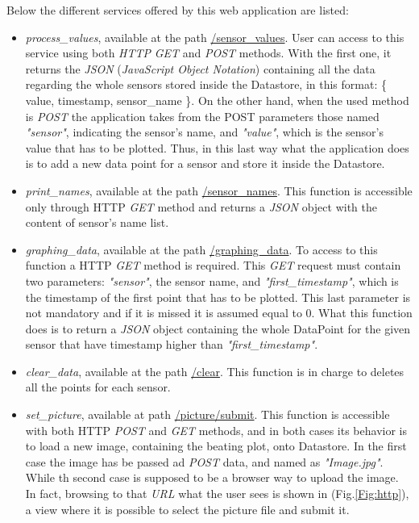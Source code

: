  Below the different services offered by this web application are listed:
 \begin{itemize}
 	\item \textit{process\_values}, available at the path \url{/sensor_values}. User can access to this service using both \textit{HTTP} \textit{GET} and \textit{POST} methods. With the first one, it  returns the \textit{JSON} (\textit{JavaScript Object Notation}) containing all the data regarding the whole sensors stored inside the Datastore, in this format: \{ value, timestamp, sensor\_name \}. On the other hand, when the used method is \textit{POST} the application takes from the POST parameters those named \textit{"sensor"}, indicating the sensor's name, and \textit{"value"}, which is the sensor's value that has to be plotted. Thus, in this last way what the application does is to add a new data point for a sensor and store it inside the Datastore.
 	\item \textit{print\_names}, available at the path \url{/sensor_names}. This function is accessible only through HTTP \textit{GET} method and returns a \textit{JSON} object with the content of sensor's name list.
 	\item \textit{graphing\_data}, available at the path \url{/graphing_data}. To access to  this function a HTTP \textit{GET} method is required. This \textit{GET} request must contain two parameters: \textit{"sensor"}, the sensor name, and \textit{"first\_timestamp"}, which is the timestamp of the first point that has to be plotted. This last parameter is not mandatory and if it is missed it is assumed equal to $0$. What this function does is to return a \textit{JSON} object containing the whole DataPoint for the given sensor that have timestamp higher than \textit{"first\_timestamp"}.
 	\item \textit{clear\_data}, available at the path \url{/clear}. This function is in charge to deletes all the points for each sensor.
 	\item \textit{set\_picture}, available at path \url{/picture/submit}. This function is accessible with both HTTP \textit{POST} and \textit{GET} methods, and in both cases its behavior is to load a new image, containing the beating plot, onto Datastore. In the first case the image has be passed ad \textit{POST} data, and named as \textit{"Image.jpg"}. While th second case is supposed to be a browser way to upload the image. In fact, browsing to that \textit{URL} what the user sees is shown in (Fig.\ref{Fig:http}), a view where it is possible to select the picture file and submit it.
 	

\end{itemize}
